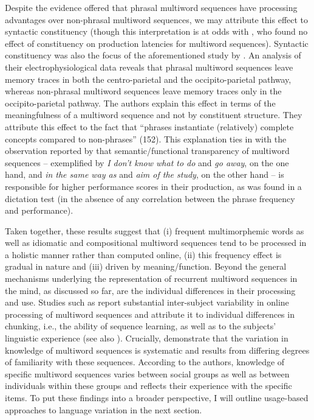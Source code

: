 Despite the evidence offered that phrasal multiword sequences have processing advantages over non-phrasal multiword sequences, we may attribute this effect to syntactic constituency (though this interpretation is at odds with \citealt{arnon-cohen}, who found no effect of constituency on production latencies for multiword sequences). Syntactic constituency was also the focus of the aforementioned study by \citet{tremblay-baayen}. An analysis of their electrophysiological data reveals that phrasal multiword sequences leave memory traces in both the centro-parietal and the occipito-parietal pathway, whereas non-phrasal multiword sequences leave memory traces only in the occipito-parietal pathway. The authors explain this effect in terms of the meaningfulness of a multiword sequence and not by constituent structure. They attribute this effect to the fact that ``phrases instantiate (relatively) complete concepts compared to non-phrases'' (152). This explanation ties in with the observation reported by \citet{schmitt-etal} that semantic/functional transparency of multiword sequences -- exemplified by \textit{I don't know what to do} and \textit{go away}, on the one hand, and \textit{in the same way as} and \textit{aim of the study}, on the other hand -- is responsible for higher performance scores in their production, as was found in a dictation test (in the absence of any correlation between the phrase frequency and performance). 

Taken together, these results suggest that (i) frequent multimorphemic words as well as idiomatic and compositional multiword sequences tend to be processed in a holistic manner rather than computed online, (ii) this frequency effect is  gradual in nature and (iii) driven by meaning/function. Beyond the general mechanisms underlying the representation of recurrent multiword sequences in the mind, as discussed so far, are the individual differences in their processing and use. Studies such as \citet[]{mccauley-christiansen-2015} report substantial inter-subject variability in  online processing of multiword sequences and attribute it to individual differences in chunking, i.e., the ability of sequence learning, as well as to the subjects' linguistic experience (see also \citealt[][192--194]{christiansen-chater-2016}). Crucially, \citet{verhagen-etal-2018} demonstrate that the variation in knowledge of multiword sequences is systematic and results from differing degrees of familiarity with these sequences. According to the authors, knowledge of specific multiword sequences varies between social groups as well as between individuals within these groups and reflects their experience with the specific items. To put these findings into a broader perspective, I will outline usage-based approaches to language variation in the next section.

